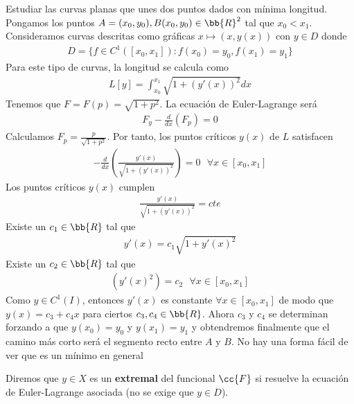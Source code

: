 \begin{ejemplo}
    Estudiar las curvas planas que unes dos puntos dados con mínima longitud. Pongamos los puntos $A=(x_0, y_0), B(x_0, y_0)\in \bb{R}^2$ tal que $x_0<x_1$.\\

    Consideramos curvas descritas como gráficas $x\mapsto (x, y(x))$ con $y\in D$ donde
    \begin{gather*}
        D=\{f\in C^1([x_0, x_1]) : f(x_0)=y_0, f(x_1)=y_1\}
    \end{gather*}
    Para este tipo de curvas, la longitud se calcula como 
    \begin{gather*}
        L[y] = \int_{x_0}^{x_1} \sqrt{1+(y'(x))^2} dx
    \end{gather*}
    Tenemos que $F=F(p) = \sqrt{1+p^2}$. La ecuación de Euler-Lagrange será 
    \begin{gather*}
        F_y - \frac{d}{dx}(F_p) = 0
    \end{gather*}
    Calculamos $F_p = \frac{p}{\sqrt{1+p^2}}$. Por tanto, los puntos críticos $y(x)$ de $L$ satisfacen
    \begin{gather*}
        -\frac{d}{dx} \left(\frac{y'(x)}{\sqrt{1+(y'(x))^2}}\right) = 0\ \ \ \forall x \in [x_0, x_1]
    \end{gather*}
    Los puntos críticos $y(x)$ cumplen 
    \begin{gather*}
        \frac{y'(x)}{\sqrt{1+(y'(x))^2}} = cte
    \end{gather*}
    Existe un $c_1\in \bb{R}$ tal que 
    \begin{gather*}
        y'(x) = c_1 \sqrt{1+y'(x)^2}
    \end{gather*}
    Existe un $c_2\in \bb{R}$ tal que 
    \begin{gather*}
        (y'(x)^2) = c_2\ \ \ \forall x \in [x_0, x_1]
    \end{gather*}
    Como $y\in C^1(I)$, entonces $y'(x)$ es constante $\forall x \in [x_0, x_1]$ de modo que $y(x) = c_3 + c_4x$ para ciertos $c_3, c_4\in \bb{R}$. Ahora $c_3$ y $c_4$ se determinan forzando a que $y(x_0)=y_0$ y $y(x_1)=y_1$ y obtendremos finalmente que el camino más corto será el segmento recto entre $A$ y $B$. No hay una forma fácil de ver que es un mínimo en general
\end{ejemplo}

\begin{definicion}
    Diremos que $y\in X$ es un \textbf{extremal} del funcional $\cc{F}$ si resuelve la ecuación de Euler-Lagrange asociada (no se exige que $y\in D$).
\end{definicion}

